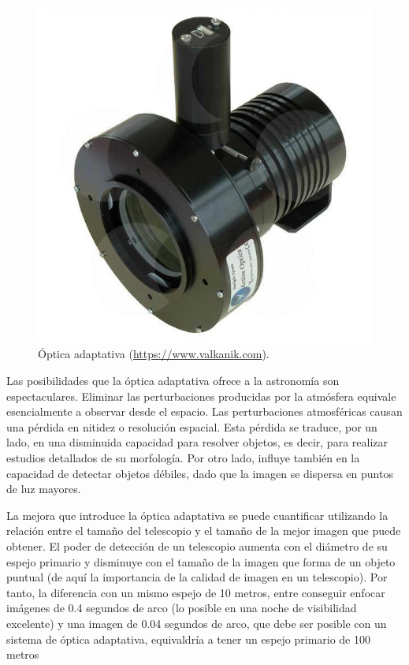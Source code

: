 \bigskip
\begin{figure}[!ht]
  \begin{center}
  \includegraphics[width=1\textwidth]{../images/optica.jpg}
  \caption{Óptica adaptativa (\url{https://www.valkanik.com}).}
  \label{fig:diag_scrum}
  \end{center}
\end{figure}


\bigskip
Las posibilidades que la óptica adaptativa ofrece a la astronomía son espectaculares. Eliminar las perturbaciones producidas por la atmósfera equivale esencialmente a observar desde el espacio. Las perturbaciones atmosféricas causan una pérdida en nitidez o resolución espacial. Esta pérdida se traduce, por un lado, en una disminuida capacidad para resolver objetos, es decir, para realizar estudios detallados de su morfología. Por otro lado, influye también en la capacidad de detectar objetos débiles, dado que la imagen se dispersa en puntos de luz mayores.

\bigskip
La mejora que introduce la óptica adaptativa se puede cuantificar utilizando la relación entre el tamaño del telescopio y el tamaño de la mejor imagen que puede obtener. El poder de detección de un telescopio aumenta con el diámetro de su espejo primario y disminuye con el tamaño de la imagen que forma de un objeto puntual (de aquí la importancia de la calidad de imagen en un telescopio). Por tanto, la diferencia con un mismo espejo de 10 metros, entre conseguir enfocar imágenes de 0.4 segundos de arco (lo posible en una noche de visibilidad excelente) y una imagen de 0.04 segundos de arco, que debe ser posible con un sistema de óptica adaptativa, equivaldría a tener un espejo primario de 100 metros

